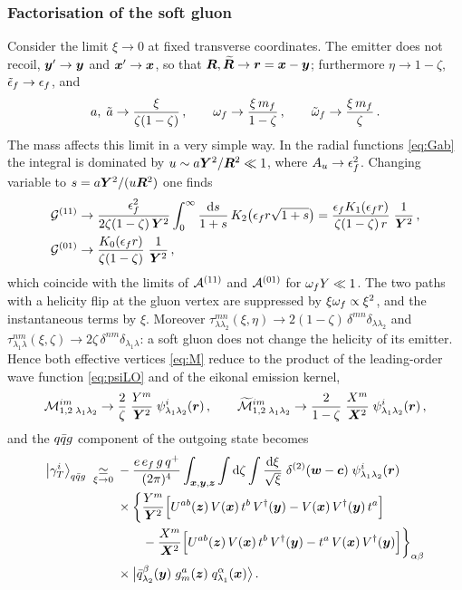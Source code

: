 \subsubsection{Factorisation of the soft gluon}

Consider the limit $\xi\to0$ at fixed transverse coordinates. The emitter does not recoil, $\bm{y}'\to\bm{y}$
and $\bm{x}'\to\bm{x}$, so that $\bm{R},\widetilde{\bm{R}}\to\bm r=\bm{x}-\bm{y}$; furthermore $\eta\to1-\zeta$, $\tilde{\epsilon}_f\to\epsilon_f$, and
\begin{equation}
a,\;\tilde a\to\frac{\xi}{\zeta(1-\zeta)}\,,\qquad\omega_f\to\frac{\xi\,m_f}{1-\zeta}\,,\qquad
\tilde{\omega}_f\to\frac{\xi\,m_f}{\zeta}\,.
\end{equation}
The mass affects this limit in a very simple way. In the radial functions \eqref{eq:Gab} the integral
is dominated by $u\sim a\bm{Y}^2/\bm{R}^2\ll1$, where $A_u\to\epsilon_f^2$. Changing variable to $s=a\bm{Y}^2/(u\bm{R}^2)$ one
finds
\begin{align}
\mathcal{G}^{(11)}&\to\frac{\epsilon_f^2}{2\zeta(1-\zeta)\,\bm{Y}^2}\int_0^\infty\frac{{\rm d} s}{1+s}\,K_2\big(\epsilon_f r\sqrt{1+s}\big)
=\frac{\epsilon_f K_1(\epsilon_f r)}{\zeta(1-\zeta)\,r}\;\frac{1}{\bm{Y}^2}\,,
\nonumber\\
\mathcal{G}^{(01)}&\to\frac{K_0(\epsilon_f r)}{\zeta(1-\zeta)}\;\frac{1}{\bm{Y}^2}\,,
\label{eq:G-soft}
\end{align}
which coincide with the limits of $\mathcal{A}^{(11)}$ and $\mathcal{A}^{(01)}$ for $\omega_f Y\ll1$. The two paths with a
helicity flip at the gluon vertex are suppressed by $\xi\omega_f\propto\xi^2$, and the instantaneous terms by
$\xi$. Moreover $\tau^{mn}_{\lambda\lambda_2}(\xi,\eta)\to2(1-\zeta)\,\delta^{mn}\delta_{\lambda\lambda_2}$
and $\tau^{nm}_{\lambda_1\lambda}(\xi,\zeta)\to2\zeta\,\delta^{nm}\delta_{\lambda_1\lambda}$: a soft gluon
does not change the helicity of its emitter. Hence both effective vertices \eqref{eq:M} reduce to the
product of the leading-order wave function \eqref{eq:psiLO} and of the eikonal emission kernel,
\begin{equation}
\mathcal{M}^{im}_{1,2\;\lambda_1\lambda_2}\to\frac{2}{\zeta}\;\frac{Y^m}{\bm{Y}^2}\;\psi^i_{\lambda_1\lambda_2}(\bm r)\,,\qquad
\widetilde{\mathcal{M}}^{im}_{1,2\;\lambda_1\lambda_2}\to\frac{2}{1-\zeta}\;\frac{X^m}{\bm{X}^2}\;\psi^i_{\lambda_1\lambda_2}(\bm r)\,,
\end{equation}
and the $q\bar q g$ component of the outgoing state becomes
\begin{align}
\big|\gamma_T^i\big\rangle_{q\bar q g}\;\underset{\xi\to0}{\simeq}\;&-\frac{e\,e_f\,g\,q^+}{(2\pi)^4}\int_{\bm{x},\bm{y},\bm{z}}
\int{\rm d}\zeta\int\frac{{\rm d}\xi}{\sqrt\xi}\;\delta^{(2)}(\bm{w}-\bm{c})\;\psi^i_{\lambda_1\lambda_2}(\bm r)
\nonumber\\
&\times\bigg\{\frac{Y^m}{\bm{Y}^2}\Big[U^{ab}(\bm{z})\,V(\bm{x})\,t^b\,V^\dagger(\bm{y})-V(\bm{x})\,V^\dagger(\bm{y})\,t^a\Big]
\nonumber\\
&\qquad-\frac{X^m}{\bm{X}^2}\Big[U^{ab}(\bm{z})\,V(\bm{x})\,t^b\,V^\dagger(\bm{y})-t^a\,V(\bm{x})\,V^\dagger(\bm{y})\Big]\bigg\}_{\alpha\beta}
\nonumber\\
&\times\big|\bar q^\beta_{\lambda_2}(\bm{y})\;g^a_m(\bm{z})\;q^\alpha_{\lambda_1}(\bm{x})\big\rangle\,.
\label{eq:state-soft}
\end{align}
